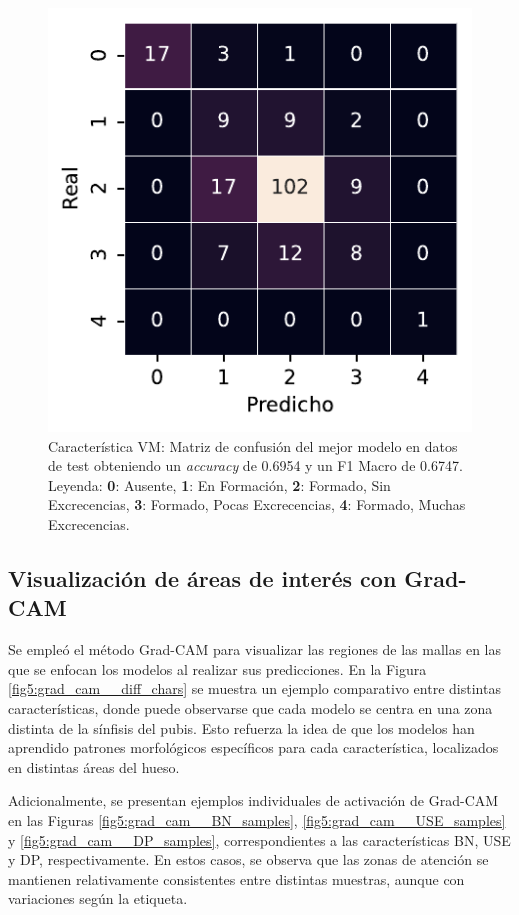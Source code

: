 \begin{figure}[htbp]
    \vspace{1.5em} %

    \includegraphics[width=0.6\linewidth]{figures/5_experiments/single-vm-cm.pdf}
    \caption[Característica VM: Matriz de confusión del mejor modelo en datos de test.]{Característica VM: Matriz de confusión del mejor modelo en datos de test obteniendo un \textit{accuracy} de 0.6954 y un F1 Macro de 0.6747. Leyenda: \textbf{0}: Ausente, \textbf{1}: En Formación, \textbf{2}: Formado, Sin Excrecencias, \textbf{3}: Formado, Pocas Excrecencias, \textbf{4}: Formado, Muchas Excrecencias.}
    \label{fig5:VM_confusion_matrix}
\end{figure}

\FloatBarrier

\subsection{Visualización de áreas de interés con Grad-CAM}

Se empleó el método Grad-CAM para visualizar las regiones de las mallas en las que se enfocan los modelos al realizar sus predicciones. En la Figura \ref{fig5:grad_cam__diff_chars} se muestra un ejemplo comparativo entre distintas características, donde puede observarse que cada modelo se centra en una zona distinta de la sínfisis del pubis. Esto refuerza la idea de que los modelos han aprendido patrones morfológicos específicos para cada característica, localizados en distintas áreas del hueso. 

Adicionalmente, se presentan ejemplos individuales de activación de Grad-CAM en las Figuras \ref{fig5:grad_cam__BN_samples}, \ref{fig5:grad_cam__USE_samples} y \ref{fig5:grad_cam__DP_samples}, correspondientes a las características BN, USE y DP, respectivamente. En estos casos, se observa que las zonas de atención se mantienen relativamente consistentes entre distintas muestras, aunque con variaciones según la etiqueta.

